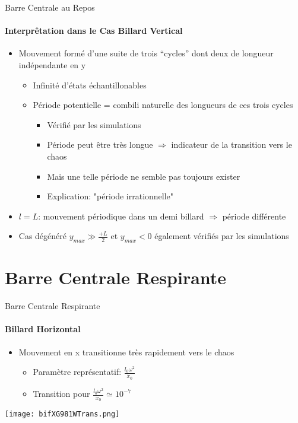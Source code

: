 \documentclass{beamer}
\begin{document}
  \begin{frame}{Barre Centrale au Repos}
  \framesubtitle{Interprêtation dans le Cas Billard Vertical}
  \begin{itemize}
    \item Mouvement formé d'une suite de trois ``cycles'' dont deux de longueur indépendante en y
    \begin{itemize}
      \item Infinité d'états échantillonables
      \item Période potentielle = combili naturelle des longueurs de ces trois cycles
      \begin{itemize}
        \item Vérifié par les simulations
        \item Période peut être très longue \(\Rightarrow\) indicateur de la transition vers le chaos
        \item Mais une telle période ne semble pas toujours exister
        \item Explication: "période irrationnelle"
      \end{itemize}
    \end{itemize}
    \item \(l=L\): mouvement périodique dans un demi billard \(\Rightarrow\) période différente 
    \item Cas dégénéré \(y_{max} \gg \frac{+L}{2}\) et \( y_{max}<0 \) également vérifiés par les simulations
  \end{itemize}
  \end{frame}

  \section{Barre Centrale Respirante}
  
  \begin{frame}{Barre Centrale Respirante}
  \framesubtitle{Billard Horizontal}
  \begin{itemize}
    \item Mouvement en x transitionne très rapidement vers le chaos
    \begin{itemize}
      \item Paramètre représentatif: \(\frac{l_0 \omega ^ 2}{\dot{x}_0}\)
      \item Transition pour \(\frac{l_0 \omega ^ 2}{\dot{x}_0} \simeq 10^{-7} \)
    \end{itemize}
  \end{itemize}
  \pause \texttt{[image: bifXG981WTrans.png]}
  \end{frame}
  
\end{document}
